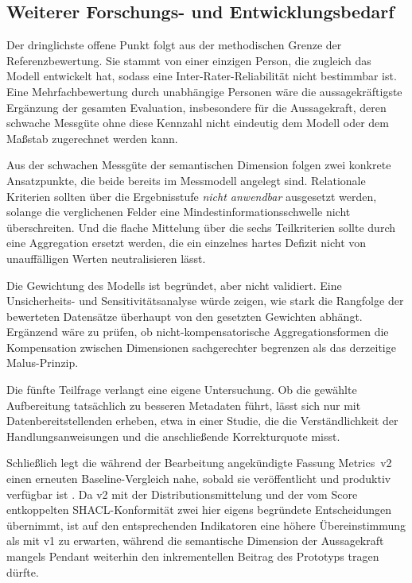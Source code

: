 \subsection{Weiterer Forschungs- und Entwicklungsbedarf}
Der dringlichste offene Punkt folgt aus der methodischen Grenze der
Referenzbewertung. Sie stammt von einer einzigen Person, die zugleich das Modell
entwickelt hat, sodass eine Inter-Rater-Reliabilität nicht bestimmbar ist. Eine
Mehrfachbewertung durch unabhängige Personen wäre die aussagekräftigste
Ergänzung der gesamten Evaluation, insbesondere für die Aussagekraft, deren schwache Messgüte ohne diese Kennzahl nicht eindeutig dem Modell oder dem Maßstab
zugerechnet werden kann.

Aus der schwachen Messgüte der semantischen Dimension folgen zwei konkrete
Ansatzpunkte, die beide bereits im Messmodell angelegt sind. Relationale
Kriterien sollten über die Ergebnisstufe \emph{nicht anwendbar} ausgesetzt
werden, solange die verglichenen Felder eine Mindestinformationsschwelle nicht
überschreiten. Und die flache Mittelung über die sechs Teilkriterien sollte durch
eine Aggregation ersetzt werden, die ein einzelnes hartes Defizit nicht von
unauffälligen Werten neutralisieren lässt.

Die Gewichtung des Modells ist begründet, aber nicht validiert. Eine
Unsicherheits- und Sensitivitätsanalyse würde zeigen, wie stark die Rangfolge der
bewerteten Datensätze überhaupt von den gesetzten Gewichten abhängt. Ergänzend
wäre zu prüfen, ob nicht-kompensatorische Aggregationsformen die Kompensation
zwischen Dimensionen sachgerechter begrenzen als das derzeitige Malus-Prinzip.

Die fünfte Teilfrage verlangt eine eigene Untersuchung. Ob die gewählte
Aufbereitung tatsächlich zu besseren Metadaten führt, lässt sich nur mit
Datenbereitstellenden erheben, etwa in einer Studie, die die Verständlichkeit der
Handlungsanweisungen und die anschließende Korrekturquote misst.

Schließlich legt die während der Bearbeitung angekündigte Fassung Metrics~v2 einen
erneuten Baseline-Vergleich nahe, sobald sie veröffentlicht und produktiv verfügbar ist
\cite{piveauMetricsV2}. Da v2 mit der Distributionsmittelung und der vom Score
entkoppelten SHACL-Konformität zwei hier eigens begründete Entscheidungen übernimmt, ist
auf den entsprechenden Indikatoren eine höhere Übereinstimmung als mit v1 zu erwarten,
während die semantische Dimension der Aussagekraft mangels Pendant weiterhin den
inkrementellen Beitrag des Prototyps tragen dürfte.

